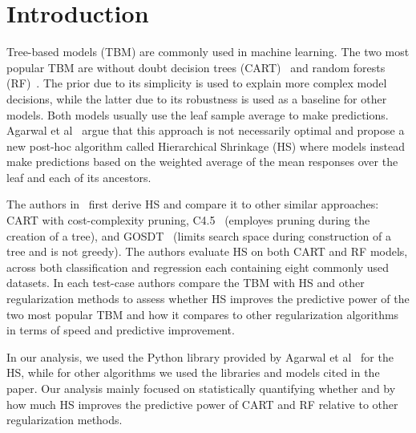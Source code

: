 \section{Introduction}
\label{sec:intro}

Tree-based models (TBM) are commonly used in machine learning.
The two most popular TBM are without doubt decision trees (CART)~\cite{breiman1984cart} and random forests (RF)~\cite{breiman2001random}.
The prior due to its simplicity is used to explain more complex model decisions, while the latter due to its robustness is used as a baseline for other models. 
Both models usually use the leaf sample average to make predictions. 
Agarwal et al~\cite{agarwal2022} argue that this approach is not necessarily optimal and propose a new post-hoc algorithm called Hierarchical Shrinkage (HS) where models instead make predictions based on the weighted average of the mean responses over the leaf and each of its ancestors.

The authors in~\cite{agarwal2022} first derive HS and compare it to other similar approaches: CART with cost-complexity pruning, C4.5~\cite{quinlan2014c4} (employes pruning during the creation of a tree), and GOSDT~\cite{pmlr-v119-lin20g} (limits search space during construction of a tree and is not greedy).
The authors evaluate HS on both CART and RF models, across both classification and regression each containing eight commonly used datasets.
In each test-case authors compare the TBM with HS and other regularization methods to assess whether HS improves the predictive power of the two most popular TBM and how it compares to other regularization algorithms in terms of speed and predictive improvement.

In our analysis, we used the Python library provided by Agarwal et al~\cite{agarwal2022} for the HS, while for other algorithms we used the libraries and models cited in the paper. Our analysis mainly focused on statistically quantifying whether and by how much HS improves the predictive power of CART and RF relative to other regularization methods. 

